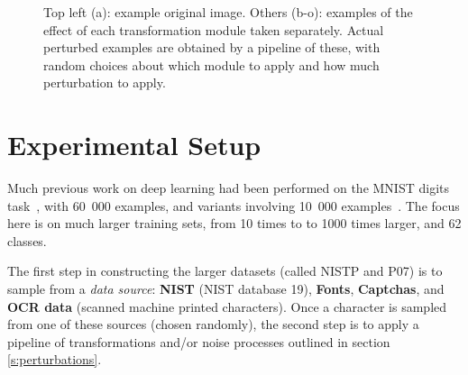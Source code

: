 \documentclass{article} %
\begin{document}
\begin{figure}[ht]
\caption{Top left (a): example original image. Others (b-o): examples of the effect
of each transformation module taken separately. Actual perturbed examples are obtained by
a pipeline of these, with random choices about which module to apply and how much perturbation
to apply.}
\label{fig:transform}
\vspace*{-2mm}
\end{figure}

\vspace*{-3mm}
\section{Experimental Setup}
\vspace*{-1mm}

Much previous work on deep learning had been performed on
the MNIST digits task~\citep{Hinton06,ranzato-07-small,Bengio-nips-2006,Salakhutdinov+Hinton-2009},
with 60~000 examples, and variants involving 10~000
examples~\citep{Larochelle-jmlr-toappear-2008,VincentPLarochelleH2008}.
The focus here is on much larger training sets, from 10 times to 
to 1000 times larger, and 62 classes.

The first step in constructing the larger datasets (called NISTP and P07) is to sample from
a {\em data source}: {\bf NIST} (NIST database 19), {\bf Fonts}, {\bf Captchas},
and {\bf OCR data} (scanned machine printed characters). Once a character
is sampled from one of these sources (chosen randomly), the second step is to
apply a pipeline of transformations and/or noise processes outlined in section \ref{s:perturbations}.
\end{document}
